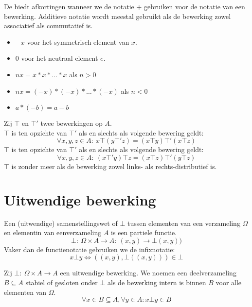 \documentclass[main.tex]{subfiles}
\begin{document}
\begin{de}
  \label{additieve-notatie}
  De  biedt afkortingen wanneer we de notatie $+$ gebruiken voor de notatie van een bewerking.
  Additieve notatie wordt meestal gebruikt als de bewerking zowel associatief als commutatief is.
  \begin{itemize}
  \item $-x$ voor het symmetrisch element van $x$.
  \item $0$ voor het neutraal element $e$.
  \item $nx = x * x * \dotsc * x$ als $n > 0$
  \item $nx = (-x) * (-x) * \dotsc * (-x)$ als $n < 0$
  \item $a * (-b) = a-b$
  \end{itemize}
\end{de}

\begin{de}
  Zij $\top$ en $\top'$ twee bewerkingen op $A$.\\
  $\top$ is  ten opzichte van $\top'$ als en slechts als volgende bewering geldt:
  \[ \forall x,y,z \in A:\ x \top (y \top' z) = (x\top y) \top' (x \top z)\]
  $\top$ is  ten opzichte van $\top'$ als en slechts als volgende bewering geldt:
  \[ \forall x,y,z \in A:\ (x \top' y) \top z = (x\top z) \top' (y \top z)\]
  $\top$ is zonder meer  als de bewerking zowel links- als rechts-distributief is.
\end{de}

\section{Uitwendige bewerking}
\label{sec:uitwendige-bewerking}

\begin{de}
  Een (uitwendige) samenstellingswet of  $\bot$ tussen elementen van een verzameling $\Omega$ en elementin van eenverzameling $A$ is een partiele functie.
  \[ \bot:\ \Omega\times A \rightarrow A:\ (x,y) \rightarrow \bot(x,y)) \]
  Vaker dan de functienotatie gebruiken we de infixnotatie:
  \[ x \bot y \Leftrightarrow  ((x,y),\bot((x,y))) \in \bot \]
\end{de}

\begin{de}
  Zij $\bot:\ \Omega\times A\rightarrow A$ een uitwendige bewerking.
  We noemen een deelverzameling $B\subseteq A$ stabiel of gesloten onder $\bot$ als de bewerking intern is binnen $B$ voor alle elementen van $\Omega$.
  \[ \forall x\in B\subseteq A, \forall y \in A: x \bot y \in B \]
\end{de}
\end{document}
